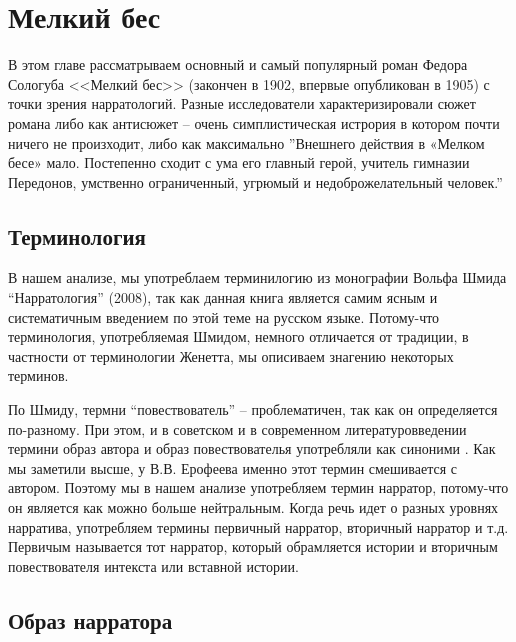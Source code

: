 \documentclass[12pt,a4paper]{article}
\begin{document}
\begin{comment}
Jerofejevin tekemä huomio monikasvoisesta \enquote{многолик} kertojasta on kuitenkin asiaankuuluva, ja tätä aspektia ei Mintsin artikkelissa oteta huomioon. Uusmytologisen tekstin myyttien keskinäinen dikotomia ei voi olla näkymättä myös romaanin kerronnassa ja narrotologisessa rakenteessa. 
\end{comment}

\section{Мелкий бес}

В этом главе рассматрываем основный и самый популярный роман Федора Сологуба <<Мелкий бес>> (закончен в 1902, впервые опубликован в 1905) с точки зрения нарратологий. Разные исследователи характеризировали сюжет романа либо как антисюжет -- очень симплистическая истрория в котором почти ничего не произходит, либо как максимально  
''Внешнего действия в «Мелком бесе» мало. Постепенно сходит с ума его главный герой, учитель гимназии Передонов, умственно ограниченный, угрюмый и недоброжелательный человек.''
\autocite[432.]{grigorjev1983}


\subsection{Терминология}

В нашем анализе, мы употреблаем терминилогию из монографии Вольфа Шмида \enquote{Нарратология} (2008), так как данная книга является самим ясным и систематичным введением по этой теме на русском языке. Потому-что терминология, употребляемая Шмидом, немного отличается от традиции, в частности от терминологии Женетта, мы описиваем знагению некоторых терминов.
  
По Шмиду, термни \enquote{повествователь} -- проблематичен, так как он
определяется по-разному. При этом, и в советском и в современном
литературовведении термини образ автора и образ повествователья употребляли как
синоними \parencite[67--68]{schmid2008}.  Как мы заметили высше, у В.В.
Ерофеева именно этот термин смешивается с автором. Поэтому мы в нашем анализе
употребляем термин нарратор, потому-что он является как можно больше
нейтральным. Когда речь идет о разных уровнях нарратива, употребляем термины
первичный нарратор, вторичный нарратор и т.д. Первичым называется тот нарратор,
который  обрамляется истории и вторичным повествователя интекста или вставной истории.

\subsection{Образ нарратора}
\end{document}
